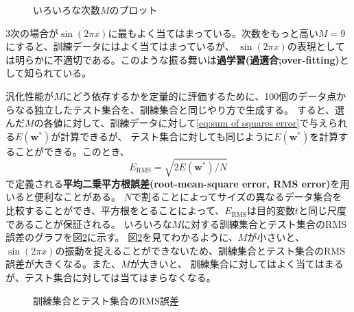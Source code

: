 \documentclass[a4paper,uplatex]{jsarticle}
\numberwithin{equation}{section}
\numberwithin{figure}{section}
\numberwithin{table}{section}
\begin{document}
\begin{figure}[htbp]
  \centering
  
  \caption{いろいろな次数\(M\)のプロット}
  \label{fig:various M}
\end{figure}

3次の場合が\(\sin (2\pi x)\)に最もよく当てはまっている。次数をもっと高い\(M=9\)にすると、訓練データにはよく当てはまっているが、
\(\sin (2\pi x)\)の表現としては明らかに不適切である。このような振る舞いは\textbf{過学習(過適合;over-fitting)}として知られている。

汎化性能が\(M\)にどう依存するかを定量的に評価するために、100個のデータ点からなる独立したテスト集合を、訓練集合と同じやり方で生成する。
すると、選んだ\(M\)の各値に対して、訓練データに対して\ref{eq:sum of squares error}で与えられる\(E(\bm{w^*})\)が計算できるが、
テスト集合に対しても同じように\(E(\bm{w^*})\)を計算することができる。このとき、
\begin{equation}
  E_{\text{RMS}} = \sqrt{2E(\bm{w^*})/N}
\end{equation}
で定義される\textbf{平均二乗平方根誤差(root-mean-square error, RMS error)}を用いると便利なことがある。
\(N\)で割ることによってサイズの異なるデータ集合を比較することができ、平方根をとることによって、\(E_{\text{RMS}}\)は目的変数\(t\)と同じ尺度であることが保証される。
いろいろな\(M\)に対する訓練集合とテスト集合のRMS誤差のグラフを図\ref{fig:RMS error}に示す。
図\ref{fig:RMS error}を見てわかるように、\(M\)が小さいと、\(\sin (2\pi x)\)の振動を捉えることができないため、訓練集合とテスト集合のRMS誤差が大きくなる。また、\(M\)が大きいと、
訓練集合に対してはよく当てはまるが、テスト集合に対しては当てはまらなくなる。
\begin{figure}[htbp]
  \centering
  
  \caption{訓練集合とテスト集合のRMS誤差}
  \label{fig:RMS error}
\end{figure}
\end{document}
